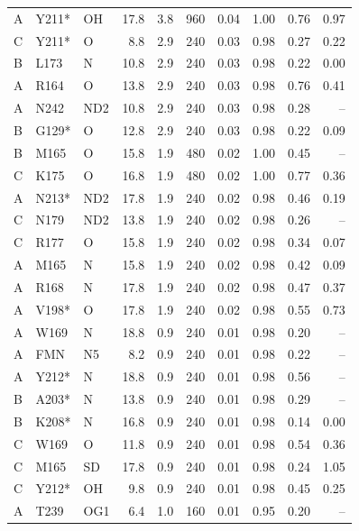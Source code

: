 \documentclass[journal=jcisd8,manuscript=suppinfo]{achemso}
\begin{document}
\begin{singlespace}
\begin{table}[!htbp]
\begin{tabular}{lllrrrrrrr}
A & Y211* & OH & 17.8 & 3.8 & 960 & 0.04 & 1.00 & 0.76 & 0.97\\
C & Y211* & O & 8.8 & 2.9 & 240 & 0.03 & 0.98 & 0.27 & 0.22\\
B & L173 & N & 10.8 & 2.9 & 240 & 0.03 & 0.98 & 0.22 & 0.00\\
A & R164 & O & 13.8 & 2.9 & 240 & 0.03 & 0.98 & 0.76 & 0.41\\
A & N242 & ND2 & 10.8 & 2.9 & 240 & 0.03 & 0.98 & 0.28 & --\\
B & G129* & O & 12.8 & 2.9 & 240 & 0.03 & 0.98 & 0.22 & 0.09\\
B & M165 & O & 15.8 & 1.9 & 480 & 0.02 & 1.00 & 0.45 & --\\
C & K175 & O & 16.8 & 1.9 & 480 & 0.02 & 1.00 & 0.77 & 0.36\\
A & N213* & ND2 & 17.8 & 1.9 & 240 & 0.02 & 0.98 & 0.46 & 0.19\\
C & N179 & ND2 & 13.8 & 1.9 & 240 & 0.02 & 0.98 & 0.26 & --\\
C & R177 & O & 15.8 & 1.9 & 240 & 0.02 & 0.98 & 0.34 & 0.07\\
A & M165 & N & 15.8 & 1.9 & 240 & 0.02 & 0.98 & 0.42 & 0.09\\
A & R168 & N & 17.8 & 1.9 & 240 & 0.02 & 0.98 & 0.47 & 0.37\\
A & V198* & O & 17.8 & 1.9 & 240 & 0.02 & 0.98 & 0.55 & 0.73\\
A & W169 & N & 18.8 & 0.9 & 240 & 0.01 & 0.98 & 0.20 & --\\
A & FMN & N5 & 8.2 & 0.9 & 240 & 0.01 & 0.98 & 0.22 & --\\
A & Y212* & N & 18.8 & 0.9 & 240 & 0.01 & 0.98 & 0.56 & --\\
B & A203* & N & 13.8 & 0.9 & 240 & 0.01 & 0.98 & 0.29 & --\\
B & K208* & N & 16.8 & 0.9 & 240 & 0.01 & 0.98 & 0.14 & 0.00\\
C & W169 & O & 11.8 & 0.9 & 240 & 0.01 & 0.98 & 0.54 & 0.36\\
C & M165 & SD & 17.8 & 0.9 & 240 & 0.01 & 0.98 & 0.24 & 1.05\\
C & Y212* & OH & 9.8 & 0.9 & 240 & 0.01 & 0.98 & 0.45 & 0.25\\
A & T239 & OG1 & 6.4 & 1.0 & 160 & 0.01 & 0.95 & 0.20 & --\\
\bottomrule\end{tabular}\end{table}


\end{singlespace}
\end{document}

